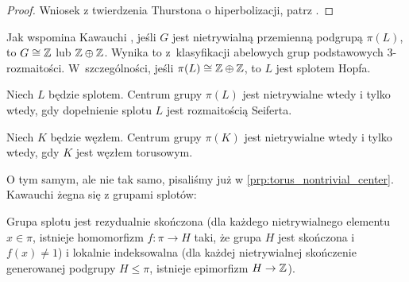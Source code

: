 \begin{proof}
    Wniosek z twierdzenia Thurstona o hiperbolizacji, patrz \cite[s. 76]{kawauchi96}.
\end{proof}

Jak wspomina Kawauchi \cite[s. 83]{kawauchi96}, jeśli $G$ jest nietrywialną przemienną podgrupą $\pi(L)$, to $G \cong \mathbb Z$ lub $\mathbb Z \oplus \mathbb Z$.
Wynika to z~klasyfikacji abelowych grup podstawowych 3-rozmaitości.
W~szczególności, jeśli $\pi(L) \cong \mathbb Z \oplus \mathbb Z$, to $L$ jest splotem Hopfa.

\begin{proposition}
    Niech $L$ będzie splotem.
    Centrum grupy $\pi(L)$ jest nietrywialne wtedy i tylko wtedy, gdy dopełnienie splotu $L$ jest rozmaitością Seiferta.
\end{proposition}

\begin{corollary}
    Niech $K$ będzie węzłem.
    Centrum grupy $\pi(K)$ jest nietrywialne wtedy i tylko wtedy, gdy $K$ jest węzłem torusowym.
\end{corollary}

O tym samym, ale nie tak samo, pisaliśmy już w \ref{prp:torus_nontrivial_center}.
Kawauchi \cite[s. 85]{kawauchi96} żegna się z grupami splotów:

\begin{proposition}
    Grupa splotu jest rezydualnie skończona (dla każdego nietrywialnego elementu $x \in \pi$, istnieje homomorfizm $f: \pi \to H$ taki, że grupa $H$ jest skończona i $f(x) \neq 1$) i lokalnie indeksowalna (dla każdej  nietrywialnej skończenie generowanej podgrupy $H \le \pi$, istnieje epimorfizm $H \to \mathbb Z$).
\end{proposition}




